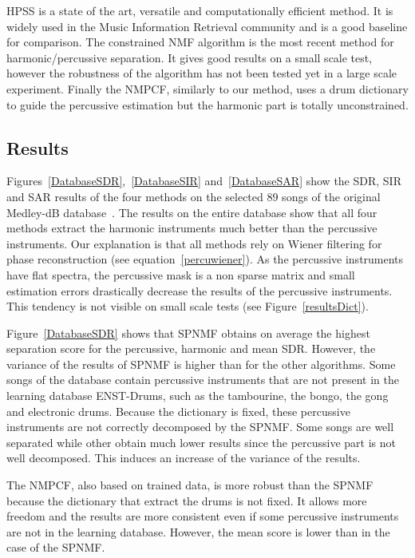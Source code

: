 HPSS is a state of the art, versatile and computationally efficient method. It is widely used in the Music Information Retrieval community and is a good baseline for comparison. The constrained NMF algorithm is the most recent method for harmonic/percussive separation. It gives good results on a small scale test, however the robustness of the algorithm has not been tested yet in a large scale experiment. Finally the NMPCF, similarly to our method, uses a drum dictionary to guide the percussive estimation but the harmonic part is totally unconstrained. 


\subsection{Results} 
\label{subResults}

Figures~\ref{DatabaseSDR},~\ref{DatabaseSIR} and~\ref{DatabaseSAR} show the SDR, SIR and SAR results of the four methods on the selected $89$ songs of the original Medley-dB database~\cite{bittner2014medleydb}. The results on the entire database show that all four methods extract the harmonic instruments much better than the percussive instruments. Our explanation is that all methods rely on Wiener filtering for phase reconstruction (see equation~\ref{percuwiener}). As the percussive instruments have flat spectra, the percussive mask is a non sparse matrix and small estimation errors drastically decrease the results of the percussive instruments. This tendency is not visible on small scale tests (see Figure~\ref{resultsDict}). 

Figure~\ref{DatabaseSDR} shows that SPNMF obtains on average the highest separation score for the percussive, harmonic and mean SDR. However, the variance of the results of SPNMF is higher than for the other algorithms. Some songs of the database contain percussive instruments that are not present in the learning database ENST-Drums, such as the tambourine, the bongo, the gong and electronic drums. Because the dictionary is fixed, these percussive instruments are not correctly decomposed by the SPNMF. Some songs are well separated while other obtain much lower results since the percussive part is not well decomposed. This induces an increase of the variance of the results. 

The NMPCF, also based on trained data, is more robust than the SPNMF because the dictionary that extract the drums is not fixed. It allows more freedom and the results are more consistent even if some percussive instruments are not in the learning database. However, the mean score is lower than in the case of the SPNMF.

